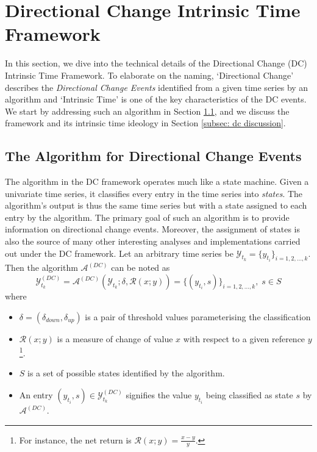 \section{Directional Change Intrinsic Time Framework}

In this section, we dive into the technical details of the Directional Change (DC) Intrinsic Time Framework. To elaborate on the naming, `Directional Change' describes the \textit{Directional Change Events} identified from a given time series by an algorithm and `Intrinsic Time' is one of the key characteristics of the DC events. We start by addressing such an algorithm in Section \ref{subsec: dc algo}, and we discuss the framework and its intrinsic time ideology in Section \ref{subsec: dc discussion}.

\subsection{The Algorithm for Directional Change Events}\label{subsec: dc algo}
The algorithm in the DC framework operates much like a state machine. Given a univariate time series, it classifies every entry in the time series into \textit{states}. The algorithm's output is thus the same time series but with a state assigned to each entry by the algorithm. The primary goal of such an algorithm is to provide information on directional change events. Moreover, the assignment of states is also the source of many other interesting analyses and implementations carried out under the DC framework. Let an arbitrary time series be $\mathcal{Y}_{t_k} = \{y_{t_i} \}_{i = 1, 2, \ldots, k}$. Then the algorithm $\mathcal{A}^{(DC)}$ can be noted as
\begin{equation*}
    \mathcal{Y}_{t_k}^{(DC)} = \mathcal{A}^{(DC)} (\mathcal{Y}_{t_k} ; \delta, \mathcal{R} (x; y)) = \{ (y_{t_i}, s)\}_{i = 1, 2, \ldots, k}, \; s \in S
\end{equation*}
where
\begin{itemize}
    \setlength\itemsep{-5pt}
    \item $\delta = (\delta_{down}, \delta_{up})$ is a pair of threshold values parameterising the classification
    \item $\mathcal{R} (x; y)$ is a measure of change of value $x$ with respect to a given reference $y$\footnote{For instance, the net return is $\mathcal{R} (x; y) = \frac{x - y}{y}$.}.
    \item $S$ is a set of possible states identified by the algorithm. 
    \item An entry $(y_{t_i}, s) \in \mathcal{Y}_{t_k}^{(DC)}$ signifies the value $y_{t_i}$ being classified as state $s$ by $\mathcal{A}^{(DC)}$.
\end{itemize}
